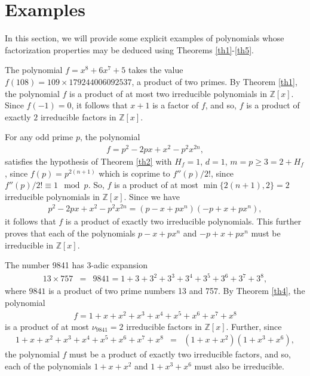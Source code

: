 \documentclass[12pt,reqno]{amsart}%
\begin{document}
\section{Examples}\label{sec:3}
In this section, we will provide some explicit examples of polynomials whose factorization properties may be deduced using Theorems \ref{th1}-\ref{th5}.
\begin{example}
The polynomial $f=x^8 + 6 x^7 + 5$ takes the value $f(108)=109\times 179244006092537$, a product of two primes. By Theorem   \ref{th1}, the polynomial $f$ is a product of at most two irreducible polynomials in $\mathbb Z[x]$. Since $f(-1)=0$, it follows that $x+1$ is a factor of $f$, and so, $f$ is a product of exactly $2$ irreducible factors in  $\mathbb Z[x]$.
\end{example}
\begin{example}
For any odd prime $p$, the polynomial
\begin{eqnarray*}
f=p^2-2px+x^2-p^2x^{2n},
\end{eqnarray*}
satisfies the hypothesis of Theorem \ref{th2} with $H_f=1$, $d=1$, $m=p\geq 3=2+H_f$, since $f(p)=p^{2(n+1)}$ which is coprime to $f''(p)/2!$, since $f''(p)/2!\equiv 1 \mod p$. So, $f$ is a product of at most $\min\{2(n+1),2\}=2$ irreducible polynomials in $\mathbb{Z}[x]$. Since we have
\begin{eqnarray*}
p^2-2px+x^2-p^2x^{2n}=(p-x+px^n)(-p+x+px^n),
\end{eqnarray*}
it follows that $f$ is a product of exactly two irreducible polynomials. This further proves that each of the polynomials $p-x+px^n$ and $-p+x+px^n$ must be irreducible in $\mathbb{Z}[x]$.
\end{example}
\begin{example} The number 9841 has $3$-adic expansion
\begin{eqnarray*}
13\times 757&=&9841= 1+3+3^2+3^3+3^4+3^5+3^6+3^7+3^8,
\end{eqnarray*}
where $9841$ is a product of two prime numbers 13 and 757. By Theorem \ref{th4}, the polynomial
\begin{eqnarray*}
f=1+x+x^2+x^3+x^4+x^5+x^6+x^7+x^8
\end{eqnarray*}
is a product of at most $\nu_{9841}=2$ irreducible factors in $\mathbb{Z}[x]$. Further, since
\begin{eqnarray*}
  1+x+x^2+x^3+x^4+x^5+x^6+x^7+x^8 &=& (1+x+x^2)(1+x^3+x^6),
\end{eqnarray*}
the polynomial $f$ must be a product of exactly two irreducible factors, and so, each of the polynomials $1+x+x^2$ and $1+x^3+x^6$ must also be irreducible.
\end{example}
\end{document}
